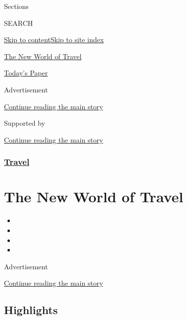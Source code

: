 Sections

SEARCH

\protect\hyperlink{site-content}{Skip to
content}\protect\hyperlink{site-index}{Skip to site index}

\href{https://www.nytimes.com/spotlight/the-new-world-of-travel}{The New
World of Travel}

\href{https://myaccount.nytimes.com/auth/login?response_type=cookie\&client_id=vi}{}

\href{https://www.nytimes.com/section/todayspaper}{Today's Paper}

Advertisement

\protect\hyperlink{after-top}{Continue reading the main story}

Supported by

\protect\hyperlink{after-sponsor}{Continue reading the main story}

\hypertarget{travel}{%
\subsubsection{\texorpdfstring{\href{/section/travel}{Travel}}{Travel}}\label{travel}}

\hypertarget{the-new-world-of-travel}{%
\section{The New World of Travel}\label{the-new-world-of-travel}}

\begin{itemize}
\item
\item
\item
\item
\end{itemize}

Advertisement

\protect\hyperlink{after-subheader}{Continue reading the main story}

\hypertarget{highlights}{%
\subsection{Highlights}\label{highlights}}

